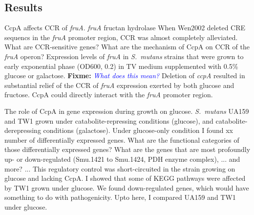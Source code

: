 \documentclass{article}
\newcommand{\fixme}[1]{{\textbf{Fixme:} \textit{\textcolor{blue}{#1}}}}
\begin{document}
\subsection{Results}

CcpA affects CCR of \textit{fruA}. 
\textit{fruA} fructan hydrolase
When Wen2002 deleted CRE sequencs in the \textit{fruA} promoter region, CCR was
almost completely alleviated. 
What are CCR-sensitive genes? 
What are the mechanism of CcpA on CCR of the \textit{fruA} operon? 
Expression levels of \textit{fruA} in \textit{S.\ mutans} strains that were
grown to early exponential phase (OD600, 0.2) in TV medium supplemented with
0.5\% glucose or galactose. \fixme{What does this mean?} 
Deletion of \textit{ccpA} resulted in substantial relief of the CCR of
\textit{fruA} expression exerted by both glucose and fructose. 
CcpA could directly interact with the \textit{fruA} promoter region. 

The role of CcpA in gene expression during growth on glucose. 
\textit{S.\ mutans} UA159 and TW1 grown under catabolite-repressing conditions
(glucose), and catabolite-derepressing conditions (galactose). Under
glucose-only condition I found xx number of differentially expressed genes. What
are the functional categories of those differentially expressed genes? What are
the genes that are most profoundly up- or down-regulated (Smu.1421 to Smu.1424,
PDH enzyme complex), ... and more? ... This regulatory control was
short-circuited in the strain growing on glucose and lacking CcpA. I showed that
some of KEGG pathways were affected by TW1 grown under glucose. We found
down-regulated genes, which would have something to do with pathogenicity. 
Upto here, I compared UA159 and TW1 under glucose.
\end{document}
